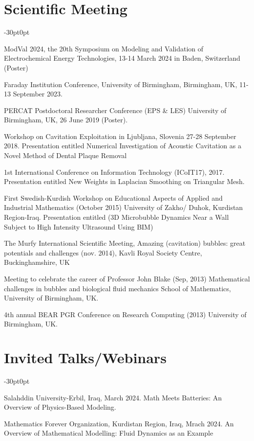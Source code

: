 \documentclass[line]{res}
\newenvironment{p1}
{\begin{adjustwidth}{-30pt}{0pt}
\vspace{8pt}}
{\end{adjustwidth}}
\begin{document}
\begin{resume}
\section{Scientific Meeting}
\begin{p1}
	\begin{etaremune}
		\item ModVal 2024, the 20th Symposium on Modeling and Validation of Electrochemical Energy Technologies, 13-14 March 2024 in Baden, Switzerland (Poster)
		\item Faraday Institution Conference, University of Birmingham, Birmingham, UK, 11-13 September 2023.
		\item PERCAT Postdoctoral Researcher Conference (EPS & LES) University of Birmingham, UK, 26 June 2019 (Poster).
		\item Workshop on Cavitation Exploitation in Ljubljana, Slovenia 27-28 September 2018. Presentation entitled Numerical Investigation of Acoustic Cavitation as a Novel Method of Dental Plaque Removal 
		\item 1st International Conference on Information Technology (ICoIT17), 2017. Presentation entitled New Weights in Laplacian Smoothing on Triangular Mesh.
		\item First Swedish-Kurdish Workshop on Educational Aspects of Applied and Industrial Mathematics (October 2015) University of Zakho/ Duhok, Kurdistan Region-Iraq. Presentation entitled (3D Microbubble Dynamics Near a Wall Subject to High Intensity Ultrasound Using BIM) 
		\item The Murfy International Scientific Meeting, Amazing (cavitation) bubbles: great potentials and challenges (nov. 2014), Kavli Royal Society Centre, Buckinghamshire, UK
		\item Meeting to celebrate the career of Professor John Blake (Sep, 2013) Mathematical challenges in bubbles and biological fluid mechanics School of Mathematics, University of Birmingham, UK.
		\item 4th annual BEAR PGR Conference on Research Computing (2013) University of Birmingham, UK.
	\end{etaremune}
	\end{p1}


	\section{Invited Talks/Webinars}
	\begin{p1}
		\begin{etaremune}
			\item Salahddin University-Erbil, Iraq, March 2024. Math Meets Batteries: An Overview of Physics-Based Modeling.
			\item Mathematics Forever Organization, Kurdistan Region, Iraq, Mrach 2024. An Overview of Mathematical Modelling: Fluid Dynamics as an Example
			

\end{etaremune}
\end{p1}
\end{resume}
\end{document}
